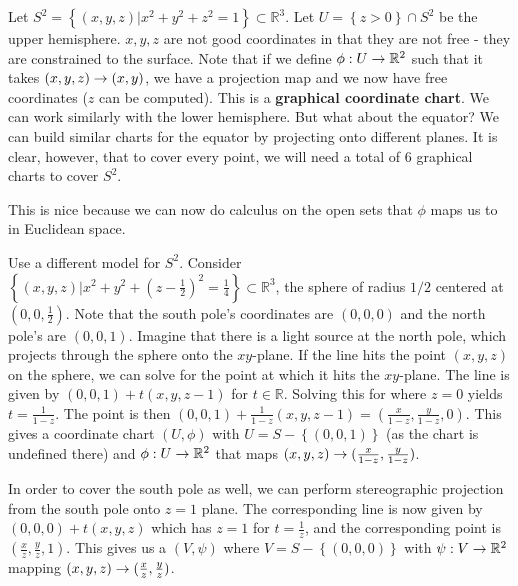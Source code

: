 \documentclass{mathnotes}
\begin{document}
\begin{exmp}
    Let $S^2=\left\{ (x,y,z) | x^2+y^2+z^2=1 \right\}\subset \mathbb{R}^3$. Let $U=\left\{ z>0 \right\}\cap S^2$ be the upper hemisphere.
    $x, y, z$ are not good coordinates in that they are not free - they are constrained to the surface. Note that if we define $\phi:U\rightarrow\mathbb{R}^2$
    such that it takes $(x,y,z)\rightarrow(x,y)$, we have a projection map and we now have free coordinates ($z$ can be computed). This is a
    \textbf{graphical coordinate chart}. We can work similarly with the lower hemisphere. But what about the equator? We can build similar charts
    for the equator by projecting onto different planes. It is clear, however, that to cover every point, we will need a total of 6 graphical charts to cover $S^2$.

    This is nice because we can now do calculus on the open sets that $\phi$ maps us to in Euclidean space.
\end{exmp}

\begin{exmp}
    Use a different model for $S^2$. Consider $\left\{ (x,y,z) | x^2+y^2+(z-\frac{1}{2})^2=\frac{1}{4} \right\}\subset\mathbb{R}^3$, the sphere of radius $1/2$
    centered at $(0,0,\frac{1}{2})$. Note that the south pole's coordinates are $(0,0,0)$ and the north pole's are $(0,0,1)$. Imagine that there is a light source
    at the north pole, which projects through the sphere onto the $xy$-plane. If the line hits the point $(x,y,z)$ on the sphere, we can solve for the point at
    which it hits the $xy$-plane. The line is given by $(0,0,1)+t(x,y,z-1)$ for $t\in\mathbb{R}$. Solving this for where $z=0$ yields $t=\frac{1}{1-z}$.
    The point is then $(0,0,1)+\frac{1}{1-z}(x,y,z-1)=(\frac{x}{1-z},\frac{y}{1-z},0)$. This gives a coordinate chart $(U,\phi)$ with $U=S-\left\{ (0,0,1) \right\}$
    (as the chart is undefined there) and $\phi:U\rightarrow \mathbb{R}^2$ that maps $(x,y,z)\rightarrow(\frac{x}{1-z},\frac{y}{1-z})$.
    
    In order to cover the south pole as well, we can perform stereographic projection from the south pole onto $z=1$ plane. The corresponding line is now
    given by $(0,0,0)+t(x,y,z)$ which has $z=1$ for $t=\frac{1}{z}$, and the corresponding point is $(\frac{x}{z},\frac{y}{z},1)$. This gives us a $(V,\psi)$
    where $V=S-\left\{ (0,0,0) \right\}$ with $\psi:V\rightarrow\mathbb{R}^2$ mapping $(x,y,z)\rightarrow(\frac{x}{z},\frac{y}{z})$.
\end{exmp}
\end{document}
